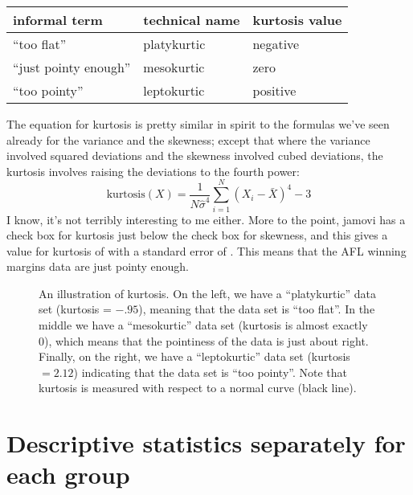 \begin{center}
\begin{tabular}{lll}
informal term & technical name & kurtosis value \\ \hline
``too flat'' & platykurtic & negative \\
``just pointy enough'' & mesokurtic & zero \\
``too pointy'' & leptokurtic & positive 
\end{tabular}
\end{center}

The equation for kurtosis is pretty similar in spirit to the formulas we've seen already for the variance and the skewness; except that where the variance involved squared deviations and the skewness involved cubed deviations, the kurtosis involves raising the deviations to the fourth power:
$$
\mbox{kurtosis}(X) = \frac{1}{N \hat\sigma^4} \sum_{i=1}^N \left( X_i - \bar{X} \right)^4  - 3
$$
I know, it's not terribly interesting to me either. More to the point, jamovi has a check box for kurtosis just below the check box for skewness, and this gives a value for kurtosis of  with a standard error of . This means that the AFL winning margins data are just pointy enough.

\begin{figure}[ht]
\begin{center}
\caption{An illustration of kurtosis. On the left, we have a ``platykurtic'' data set (kurtosis = $-.95$), meaning that the data set is ``too flat''. In the middle we have a ``mesokurtic'' data set (kurtosis is almost exactly 0), which means that the pointiness of the data is just about right. Finally, on the right, we have a ``leptokurtic'' data set (kurtosis $= 2.12$) indicating that the data set is ``too pointy''. Note that kurtosis is measured with respect to a normal curve (black line).}
\label{fig:kurtosis}
\HR
\end{center}
\end{figure}


\section{Descriptive statistics separately for each group~\label{sec:groupdescriptives}}

